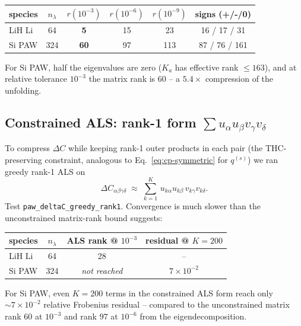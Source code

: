 \documentclass[aps,prb,reprint,superscriptaddress,nofootinbib]{revtex4-2}
\begin{document}
\begin{table}[h]
\centering
\begin{tabular}{lccccc}
\hline
species & \(n_\lambda\) & \(r(10^{-3})\) & \(r(10^{-6})\) & \(r(10^{-9})\) & signs (+/-/0) \\
\hline
LiH Li & 64  & \textbf{5}   & 15 & 23  & 16 / 17 / 31 \\
Si PAW & 324 & \textbf{60}  & 97 & 113 & 87 / 76 / 161 \\
\hline
\end{tabular}
\end{table}

For Si PAW, half the eigenvalues are zero (\(K_a\) has effective rank
\(\le 163\)), and at relative tolerance \(10^{-3}\) the matrix rank is
\(60\) -- a \(5.4\times\) compression of the unfolding.

\subsection{Constrained ALS: rank-1 form
\texorpdfstring{$\sum u_\alpha u_\beta v_\gamma v_\delta$}{Sum u u v v}}

To compress \(\Delta C\) while keeping rank-1 outer products in each
pair (the THC-preserving constraint, analogous to
Eq.~\eqref{eq:cp-symmetric} for \(q^{(s)}\)) we ran greedy rank-1 ALS
on
\begin{equation}
\Delta C_{\alpha\beta\gamma\delta}
\;\approx\;
\sum_{k=1}^{K}\,u_{k\alpha}u_{k\beta}\,v_{k\gamma}v_{k\delta}.
\label{eq:dC-uuvv}
\end{equation}
Test \texttt{paw\_deltaC\_greedy\_rank1}.  Convergence is much slower
than the unconstrained matrix-rank bound suggests:

\begin{table}[h]
\centering
\begin{tabular}{lccc}
\hline
species & \(n_\lambda\) & ALS rank @ \(10^{-3}\) & residual @ \(K=200\) \\
\hline
LiH Li & 64  & 28      & --   \\
Si PAW & 324 & \emph{not reached} & \(7\times 10^{-2}\) \\
\hline
\end{tabular}
\end{table}

For Si PAW, even \(K=200\) terms in the constrained ALS form reach
only \(\sim7\times 10^{-2}\) relative Frobenius residual -- compared
to the unconstrained matrix rank \(60\) at \(10^{-3}\) and rank \(97\)
at \(10^{-6}\) from the eigendecomposition.
\end{document}
